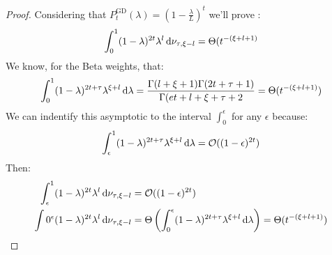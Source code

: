 \documentclass{article}
\begin{document}
\gdrates*
\begin{proof}
Considering that $P_t^\text{GD}(\lambda)=(1-\frac{\lambda}{L})^t$ we'll prove :
\begin{equation}
    \int_0^1(1-\lambda)^{2t}\lambda^l\mathop{}\!\mathrm{d}\nu_{\tau,\xi-l}=\Theta(t^{-(\xi+l+1)}
\end{equation}
We know, for the Beta weights, that:
\begin{equation}
    \int_0^1(1-\lambda)^{2t+\tau}\lambda^{\xi+l}\mathop{}\!\mathrm{d}\lambda=\frac{\Gamma(l+\xi+1)\Gamma(2t+\tau+1)}{\Gamma(et+l+\xi+\tau+2}=\Theta(t^{-(\xi+l+1)})
\end{equation}
We can indentify this asymptotic to the interval $\int_0^\epsilon$ for any $\epsilon$ because:
\begin{equation}
    \int_\epsilon^1(1-\lambda)^{2t+\tau}\lambda^{\xi+l}\mathop{}\!\mathrm{d}\lambda=\mathcal{O}((1-\epsilon)^{2t})
\end{equation}
Then:
\begin{align}
    \int_\epsilon^1(1-\lambda)^{2t}\lambda^l\mathop{}\!\mathrm{d}\nu_{\tau,\xi-l}&=\mathcal{O}((1-\epsilon)^{2t}) \\
    \int0^\epsilon(1-\lambda)^{2t}\lambda^l\mathop{}\!\mathrm{d}\nu_{\tau,\xi-l}&=\Theta\left(\int_0^\epsilon(1-\lambda)^{2t+\tau}\lambda^{\xi+l}\mathop{}\!\mathrm{d}\lambda\right)=\Theta(t^{-(\xi+l+1)})
\end{align}

\end{proof}

\end{document}
